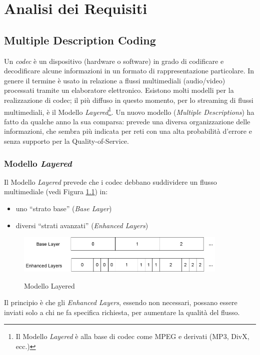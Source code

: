 \chapter{Analisi dei Requisiti}
\label{cap:analisi_requisiti}




\section{Multiple Description Coding}


Un \emph{codec} è un dispositivo (hardware o software) in grado di codificare e
decodificare alcune informazioni in un formato di rappresentazione particolare.
In genere il termine è usato in relazione a flussi multimediali (audio/video)
processati tramite un elaboratore elettronico. Esistono molti modelli per la
realizzazione di codec; il più diffuso in questo momento, per lo streaming di
flussi multimediali, è il Modello \emph{Layered}\footnote{Il Modello
\emph{Layered} è alla base di codec come MPEG e derivati (MP3, DivX, ecc.)}. Un
nuovo modello (\emph{Multiple Descriptions}) ha fatto da qualche anno la sua
comparsa: prevede una diversa organizzazione delle informazioni, che sembra più
indicata per reti con una alta probabilità d'errore e senza supporto per la
Quality-of-Service.


\subsection{Modello \emph{Layered}}
Il Modello \emph{Layered} prevede che i codec debbano suddividere un flusso
multimediale (vedi Figura \ref{fig:modello_layered}) in:
\begin{itemize}
  \item uno ``strato base'' (\emph{Base Layer})
  \item diversi ``strati avanzati'' (\emph{Enhanced Layers}) 
\end{itemize}

\begin{figure}[hb]
\includegraphics[width=0.90\textwidth]{../images/modello_layered.png}
\label{fig:modello_layered}
\caption{Modello Layered}
\end{figure}

Il principio è che gli \emph{Enhanced Layers}, essendo non necessari, possano
essere inviati solo a chi ne fa specifica richiesta, per aumentare la
qualità del flusso.



